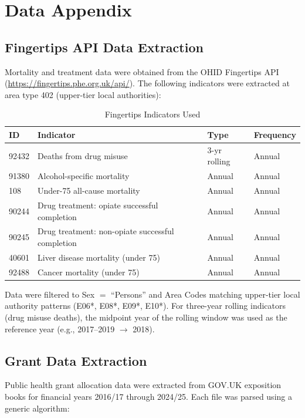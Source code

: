 \documentclass[12pt]{article}
\begin{document}
\newpage
\appendix

\section{Data Appendix}
\label{app:data}

\subsection{Fingertips API Data Extraction}

Mortality and treatment data were obtained from the OHID Fingertips API (\url{https://fingertips.phe.org.uk/api/}). The following indicators were extracted at area type 402 (upper-tier local authorities):

\begin{table}[H]
\centering
\caption{Fingertips Indicators Used}
\label{tab:indicators}
\begin{tabular}{llll}
\toprule
ID & Indicator & Type & Frequency \\
\midrule
92432 & Deaths from drug misuse & 3-yr rolling & Annual \\
91380 & Alcohol-specific mortality & Annual & Annual \\
108 & Under-75 all-cause mortality & Annual & Annual \\
90244 & Drug treatment: opiate successful completion & Annual & Annual \\
90245 & Drug treatment: non-opiate successful completion & Annual & Annual \\
40601 & Liver disease mortality (under 75) & Annual & Annual \\
92488 & Cancer mortality (under 75) & Annual & Annual \\
\bottomrule
\end{tabular}
\end{table}

Data were filtered to Sex $=$ ``Persons'' and Area Codes matching upper-tier local authority patterns (E06*, E08*, E09*, E10*). For three-year rolling indicators (drug misuse deaths), the midpoint year of the rolling window was used as the reference year (e.g., 2017--2019 $\rightarrow$ 2018).

\subsection{Grant Data Extraction}

Public health grant allocation data were extracted from GOV.UK exposition books for financial years 2016/17 through 2024/25. Each file was parsed using a generic algorithm:
\end{document}
